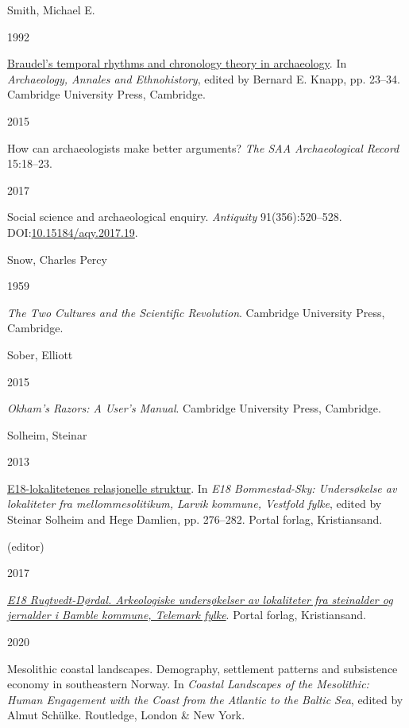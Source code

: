 \documentclass[
  a4paper,
  oneside]{uiophdthesis}
\newlength{\cslhangindent}
\newlength{\csllabelwidth}
\newlength{\cslentryspacingunit} %
\newenvironment{CSLReferences}[2] %
 {%
  \setlength{\parindent}{0pt}
  \ifodd #1
  \let\oldpar\par
  \def\par{\hangindent=\cslhangindent\oldpar}
  \fi
  \setlength{\parskip}{#2\cslentryspacingunit}
 }%
 {}
\newcommand{\CSLBlock}[1]{#1\hfill\break}
\newcommand{\CSLLeftMargin}[1]{\parbox[t]{\csllabelwidth}{#1}}
\newcommand{\CSLRightInline}[1]{\parbox[t]{\linewidth - \csllabelwidth}{#1}\break}
\begin{document}
\begin{CSLReferences}{0}{0}
\leavevmode{}%
\CSLBlock{Smith, Michael E.}
\CSLLeftMargin{ 1992}
\CSLRightInline{\href{https://doi.org/10.1017/CBO9780511759949}{{Braudel's temporal rhythms and chronology theory in archaeology}}. In \emph{{Archaeology, Annales and Ethnohistory}}, edited by Bernard E. Knapp, pp. 23--34. Cambridge University Press, Cambridge.}

\leavevmode{}%
\CSLLeftMargin{ 2015 }
\CSLRightInline{{How can archaeologists make better arguments?} \emph{The SAA Archaeological Record} 15:18--23.}

\leavevmode{}%
\CSLLeftMargin{ 2017 }
\CSLRightInline{{Social science and archaeological enquiry}. \emph{Antiquity} 91(356):520--528. DOI:\href{https://doi.org/10.15184/aqy.2017.19}{10.15184/aqy.2017.19}.}

\leavevmode{}%
\CSLBlock{Snow, Charles Percy}
\CSLLeftMargin{ 1959}
\CSLRightInline{\emph{{The Two Cultures and the Scientific Revolution}}. Cambridge University Press, Cambridge.}

\leavevmode{}%
\CSLBlock{Sober, Elliott}
\CSLLeftMargin{ 2015}
\CSLRightInline{\emph{{Okham's Razors: A User's Manual}}. Cambridge University Press, Cambridge.}

\leavevmode{}%
\CSLBlock{Solheim, Steinar}
\CSLLeftMargin{ 2013}
\CSLRightInline{\href{https://doi.org/10.23865/noasp.53}{{E18-lokalitetenes relasjonelle struktur}}. In \emph{{E18 Bommestad-Sky: Undersøkelse av lokaliteter fra mellommesolitikum, Larvik kommune, Vestfold fylke}}, edited by Steinar Solheim and Hege Damlien, pp. 276--282. Portal forlag, Kristiansand.}

\leavevmode{}%
\CSLBlock{ (editor)}
\CSLLeftMargin{ 2017}
\CSLRightInline{\emph{\href{https://doi.org/10.23865/noasp.58}{{E18 Rugtvedt-Dørdal. Arkeologiske undersøkelser av lokaliteter fra steinalder og jernalder i Bamble kommune, Telemark fylke}}}. Portal forlag, Kristiansand.}

\leavevmode{}%
\CSLLeftMargin{ 2020 }
\CSLRightInline{{Mesolithic coastal landscapes. Demography, settlement patterns and subsistence economy in southeastern Norway}. In \emph{{Coastal Landscapes of the Mesolithic: Human Engagement with the Coast from the Atlantic to the Baltic Sea}}, edited by Almut Schülke. Routledge, London \& New York.}


\end{CSLReferences}
\end{document}
